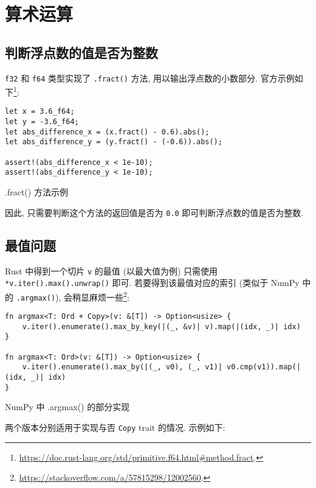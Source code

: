 \documentclass{crbook}
\begin{document}
\newpage
\section{算术运算}
\subsection{判断浮点数的值是否为整数}

\texttt{f32} 和 \texttt{f64} 类型实现了 \texttt{.fract()} 方法, 用以输出浮点数的小数部分. 官方示例如下\footnote{\url{https://doc.rust-lang.org/std/primitive.f64.html\#method.fract}.}:

\begin{listing}
    \linespread{1}
    \begin{verbatim}
let x = 3.6_f64;
let y = -3.6_f64;
let abs_difference_x = (x.fract() - 0.6).abs();
let abs_difference_y = (y.fract() - (-0.6)).abs();

assert!(abs_difference_x < 1e-10);
assert!(abs_difference_y < 1e-10);
    \end{verbatim}
    \caption{.fract() 方法示例}
\end{listing}

因此, 只需要判断这个方法的返回值是否为 \texttt{0.0} 即可判断浮点数的值是否为整数.

\subsection{最值问题}

Rust 中得到一个切片 \texttt{v} 的最值 (以最大值为例) 只需使用 \texttt{*v.iter().max().unwrap()} 即可. 若要得到该最值对应的索引 (类似于 NumPy 中的 \texttt{.argmax()}), 会稍显麻烦一些\footnote{\url{https://stackoverflow.com/a/57815298/12002560}.}:

\begin{listing}
    \linespread{1}
    \begin{verbatim}
fn argmax<T: Ord + Copy>(v: &[T]) -> Option<usize> {
    v.iter().enumerate().max_by_key(|(_, &v)| v).map(|(idx, _)| idx)
}

fn argmax<T: Ord>(v: &[T]) -> Option<usize> {
    v.iter().enumerate().max_by(|(_, v0), (_, v1)| v0.cmp(v1)).map(|(idx, _)| idx)
}
    \end{verbatim}
    \caption{NumPy 中 .argmax() 的部分实现}
\end{listing}

\noindent 两个版本分别适用于实现与否 \texttt{Copy} trait 的情况. 示例如下:
\end{document}
